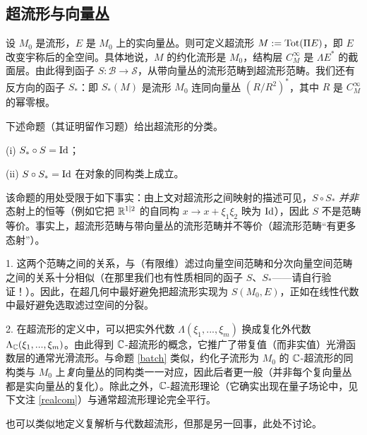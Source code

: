 
\subsection{超流形与向量丛}

设 $M_0$ 是流形，$E$ 是 $M_0$ 上的实向量丛。则可定义超流形 $M:={\rm Tot}(\Pi E)$，即 $E$ 改变宇称后的全空间。具体地说，$M$ 的约化流形是 $M_0$，结构层 $C^\infty_M$ 是 $\Lambda E^*$ 的截面层。由此得到函子 $S: {\mathcal {B}}\to {\mathcal {S}}$，从带向量丛的流形范畴到超流形范畴。我们还有反方向的函子 $S_*$：即 $S_*(M)$ 是流形 $M_0$ 连同向量丛 $(R/R^2)^*$，其中 $R$ 是 $C^\infty_M$ 的幂零根。

下述命题（其证明留作习题）给出超流形的分类。

\begin{proposition}\label{batch} (i) $S_*\circ S={\rm Id}$；

(ii) $S\circ S_*={\rm Id}$ 在对象的同构类上成立。
\end{proposition}

该命题的用处受限于如下事实：由上文对超流形之间映射的描述可见，$S\circ S_*$ \emph{并非}态射上的恒等（例如它把 $\Bbb R^{1|2}$ 的自同构 $x\to x+\xi_1\xi_2$ 映为 ${\rm Id}$），因此 $S$ 不是范畴等价。事实上，超流形范畴与带向量丛的流形范畴并不等价（超流形范畴“有更多态射”）。

\begin{remark} 1. 这两个范畴之间的关系，与（有限维）滤过向量空间范畴和分次向量空间范畴之间的关系十分相似（在那里我们也有性质相同的函子 $S$、$S_*$——请自行验证！）。因此，在超几何中最好避免把超流形实现为 $S(M_0,E)$，正如在线性代数中最好避免选取滤过空间的分裂。

2. 在超流形的定义中，可以把实外代数 $\Lambda(\xi_1,...,\xi_m)$ 换成复化外代数 $\Lambda_{\Bbb C}(\xi_1,...,\xi_m)$。由此得到 $\Bbb C$-超流形的概念，它推广了带复值（而非实值）光滑函数层的通常光滑流形。与命题 \ref{batch} 类似，约化子流形为 $M_0$ 的 $\Bbb C$-超流形的同构类与 $M_0$ 上\emph{复}向量丛的同构类一一对应，因此后者更一般（并非每个复向量丛都是实向量丛的复化）。除此之外，$\Bbb C$-超流形理论（它确实出现在量子场论中，见下文注 \ref{realcom}）与通常超流形理论完全平行。

也可以类似地定义复解析与代数超流形，但那是另一回事，此处不讨论。
\end{remark}

